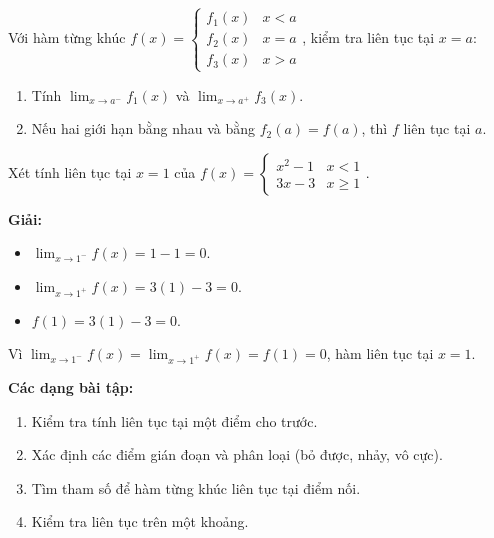 \documentclass[12pt,a4paper]{article}
\begin{document}
\begin{phuongphap}[title={Kiểm tra tính liên tục của hàm từng khúc}]
  Với hàm từng khúc $f(x) = \begin{cases} f_1(x) & x < a \\ f_2(x) & x = a \\ f_3(x) & x > a \end{cases}$, kiểm tra liên tục tại $x = a$:
  \begin{enumerate}
    \item Tính $\displaystyle\lim_{x \to a^-} f_1(x)$ và $\displaystyle\lim_{x \to a^+} f_3(x)$.
    \item Nếu hai giới hạn bằng nhau và bằng $f_2(a) = f(a)$, thì $f$ liên tục tại $a$.
  \end{enumerate}
\end{phuongphap}

\begin{vidu}
  Xét tính liên tục tại $x = 1$ của $f(x) = \begin{cases} x^2 - 1 & x < 1 \\ 3x - 3 & x \ge 1 \end{cases}$.

  \medskip\textbf{Giải:}
  \begin{itemize}
    \item $\displaystyle\lim_{x \to 1^-} f(x) = 1 - 1 = 0$.
    \item $\displaystyle\lim_{x \to 1^+} f(x) = 3(1) - 3 = 0$.
    \item $f(1) = 3(1) - 3 = 0$.
  \end{itemize}
  Vì $\displaystyle\lim_{x \to 1^-} f(x) = \lim_{x \to 1^+} f(x) = f(1) = 0$, hàm liên tục tại $x = 1$.
\end{vidu}

\medskip\noindent\textbf{Các dạng bài tập:}
\begin{enumerate}[label=\textbf{Dạng \arabic*:}, leftmargin=*, align=left]
  \item Kiểm tra tính liên tục tại một điểm cho trước.
  \item Xác định các điểm gián đoạn và phân loại (bỏ được, nhảy, vô cực).
  \item Tìm tham số để hàm từng khúc liên tục tại điểm nối.
  \item Kiểm tra liên tục trên một khoảng.
\end{enumerate}

\end{document}
